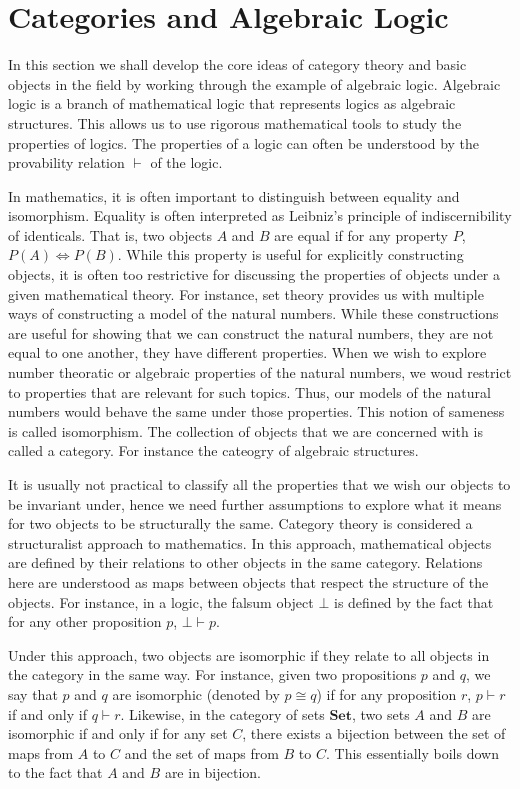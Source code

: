 \section{Categories and Algebraic Logic}\label{sec:cat_alg_logic}
In this section we shall develop the core ideas of category theory and basic objects in the field
by working through the example of algebraic logic.
Algebraic logic is a branch of mathematical logic that represents logics as algebraic structures.
This allows us to use rigorous mathematical tools to study the properties of logics.
The properties of a logic can often be understood by 
the provability relation $\vdash$ of the logic.

In mathematics, it is often important to distinguish between equality and isomorphism.
Equality is often interpreted as Leibniz's principle of indiscernibility of identicals.
That is, two objects $A$ and $B$ are equal if for any property $P$, $P(A)\iff P(B)$.
While this property is useful for explicitly constructing objects,
it is often too restrictive for discussing the properties of objects under
a given mathematical theory. For instance, set theory
provides us with multiple ways of constructing a model of the natural numbers.
While these constructions are useful for showing that we can construct the natural numbers,
they are not equal to one another, they have different properties.
When we wish to explore number theoratic or algebraic properties of the natural numbers,
we woud restrict to properties that are relevant for such topics. Thus, our
models of the natural numbers would behave the same under those properties. This notion
of sameness is called isomorphism. The collection of objects that we are concerned
with is called a category. For instance the cateogry of algebraic structures.

It is usually not practical to classify all the properties that we wish our objects to be invariant under,
hence we need further assumptions to explore what it means for two objects to be structurally the same.
Category theory is considered a structuralist approach to mathematics.
In this approach, mathematical objects are defined by their relations to other objects
in the same category. 
Relations here are understood as maps between objects that respect the structure of the objects.
For instance, in a logic, the falsum object $\bot$ is defined by the fact that for any
other proposition $p$, $\bot\vdash p$.

Under this approach, two objects are isomorphic if they relate to all objects in the category
in the same way. For instance, given two propositions $p$ and $q$, we say that $p$ and $q$
are isomorphic (denoted by $p\cong q$) if for any proposition $r$, $p\vdash r$ if and only if $q\vdash r$.
Likewise, in the category of sets $\mathbf{Set}$, two sets $A$ and $B$ are isomorphic if and only if
for any set $C$, there exists a bijection between the set of maps from $A$ to $C$ and the set of maps from $B$ to $C$.
This essentially boils down to the fact that $A$ and $B$ are in bijection.

